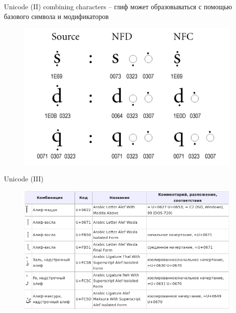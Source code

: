 \documentclass{beamer}
\begin{document}
\begin{frame}{Unicode (II)}
combining characters -- глиф может образовываться с помощью базового символа и модификаторов\\
\medskip
\begin{figure}[H]
\includegraphics[scale=0.4]{combining.png} 
\end{figure}
\end{frame}

\begin{frame}{Unicode (III)}
\begin{figure}[H]
\includegraphics[scale=0.35]{combining-arabic.png} 
\end{figure}
\end{frame}
\end{document}
